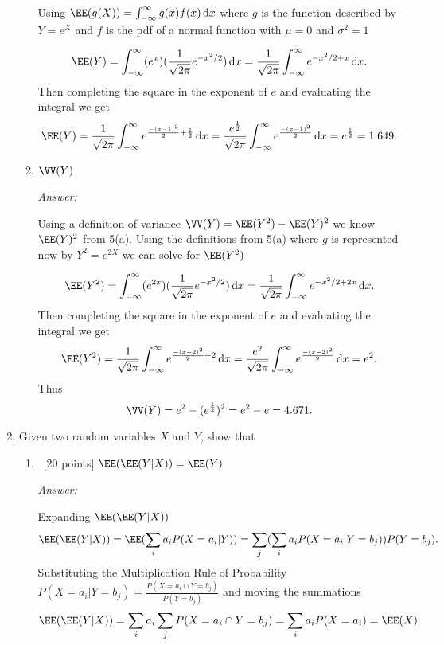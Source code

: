 \documentclass[12pt, fullpage,letterpaper]{article}
\begin{document}
\begin{enumerate}
\begin{enumerate}
  Using $\EE(g(X)) = \int_{-\infty}^{\infty} g(x) f(x) \, \mathrm{d}x$ where $g$ is the function described by $Y = e^X$ and 
  $f$ is the pdf of a normal function with $\mu = 0$ and $\sigma^2 = 1$

  \[
  \EE(Y) = \int_{-\infty}^{\infty} (e^x) (\frac{1}{\sqrt{2 \pi}} e^{-x^2/2}) \, \mathrm{d}x =
  \frac{1}{\sqrt{2 \pi}} \int_{-\infty}^{\infty} e^{-x^2/2 + x} \, \mathrm{d}x.
  \]
  Then completing the square in the exponent of $e$ and evaluating the integral we get
  \[
  \EE(Y) = \frac{1}{\sqrt{2 \pi}} \int_{-\infty}^{\infty} e^{\frac{-(x-1)^2}{2} + \frac{1}{2}} \, \mathrm{d}x = 
  \frac{e^{\frac{1}{2}}}{\sqrt{2 \pi}} \int_{-\infty}^{\infty} e^{\frac{-(x-1)^2}{2}} \, \mathrm{d}x =
  e^{\frac{1}{2}} = 1.649.
  \]

	\item $\VV(Y)$

  \textit{Answer:} 

  Using a definition of variance $\VV(Y) = \EE(Y^2) - \EE(Y)^2$ we know $\EE(Y)^2$ from 5(a).
  Using the definitions from 5(a) where $g$ is represented now by $Y^2 = e^{2X}$ we can solve for $\EE(Y^2)$

  \[
  \EE(Y^2) = \int_{-\infty}^{\infty} (e^{2x}) (\frac{1}{\sqrt{2 \pi}} e^{-x^2/2}) \, \mathrm{d}x =
  \frac{1}{\sqrt{2 \pi}} \int_{-\infty}^{\infty} e^{-x^2/2 + 2x} \, \mathrm{d}x.
  \]
  Then completing the square in the exponent of $e$ and evaluating the integral we get
  \[
  \EE(Y^2) = \frac{1}{\sqrt{2 \pi}} \int_{-\infty}^{\infty} e^{\frac{-(x-2)^2}{2} + 2} \, \mathrm{d}x = 
  \frac{e^2}{\sqrt{2 \pi}} \int_{-\infty}^{\infty} e^{\frac{-(x-2)^2}{2}} \, \mathrm{d}x = e^2.
  \]
  Thus
  \[
  \VV(Y) = e^2 - (e^{\frac{1}{2}})^2 = e^2 - e = 4.671.
  \]


\end{enumerate}

\item  Given two random variables $X$ and $Y$, show that 
\begin{enumerate}
  \item~[20 points] $\EE(\EE(Y|X)) = \EE(Y)$

  \textit{Answer:} 

  Expanding $\EE(\EE(Y|X))$
  \[
  \EE(\EE(Y|X)) = \EE(\sum_{i} a_i P(X = a_i | Y)) = \sum_j (\sum_i a_i P(X = a_i | Y = b_j)) P(Y = b_j).
  \]
  Substituting the Multiplication Rule of Probability $P(X = a_i | Y = b_j) = \frac{P(X = a_i \cap Y = b_j)}{P(Y = b_j)}$ and moving the summations 
  \[
  \EE(\EE(Y|X)) = \sum_i a_i \sum_j P(X = a_i \cap Y = b_j) = \sum_i a_i P(X = a_i) = \EE(X).
  \]


\end{enumerate}
\end{enumerate}
\end{document}
